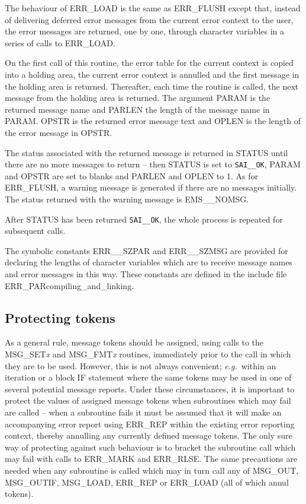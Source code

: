 \documentclass[twoside,11pt]{starlink}
\providecommand{\const}[1]{\texttt{#1}}
\providecommand{\saiok}{\const{SAI\_\_OK}}
\begin{document}
The behaviour of ERR\_LOAD is the same as ERR\_FLUSH except that, instead of
delivering deferred error messages from the current error context to the
user, the error messages are returned, one by one, through character variables
in a series of calls to ERR\_LOAD.

On the first call of this routine, the error table for the current
context is copied into a holding area, the current error context
is annulled and the first message in the holding area is returned.
Thereafter, each time the routine is called, the next message from
the holding area is returned.
The argument PARAM is the returned message name and PARLEN the length of the
message name in PARAM.
OPSTR is the returned error message text and OPLEN is the length of
the error message in OPSTR.

The status associated with the returned message is returned in STATUS
until there are no more messages to return -- then STATUS is set to
\saiok, PARAM and OPSTR are set to blanks and PARLEN and OPLEN to 1.
As for ERR\_FLUSH, a warning message is generated if there are no messages
initially. The status returned with the warning message is EMS\_\_NOMSG.

After STATUS has been returned \saiok, the whole process is repeated
for subsequent calls.

The symbolic constants ERR\_\_SZPAR and ERR\_\_SZMSG are provided for
declaring the lengths of character variables which are to receive message
names and error messages in this way.
These constants are defined in the include file
\htmlref
{ERR\_PAR}{compiling_and_linking}.

\subsection{Protecting tokens}
As a general rule, message tokens should be assigned, using calls to the
MSG\_SET\textit{x} and MSG\_FMT\textit{x} routines, immediately prior to the call
in which they are to be used.
However, this is not always convenient; \textit{e.g.}\ within an iteration
or a block IF statement where the same tokens may be used in one of several
potential message reports.
Under these circumstances, it is important to protect the values of assigned
message tokens when subroutines which may fail are called -- when a subroutine
fails it must be assumed that it will make an accompanying error report
using ERR\_REP within the existing error reporting context, thereby annulling
any currently defined message tokens.
The only sure way of protecting against such behaviour is to bracket the
subroutine call which may fail with calls to ERR\_MARK and ERR\_RLSE.
The same precautions are needed when any subroutine is called which
may in turn call any of MSG\_OUT, MSG\_OUTIF, MSG\_LOAD, ERR\_REP or ERR\_LOAD
(all of which annul tokens).
\end{document}
